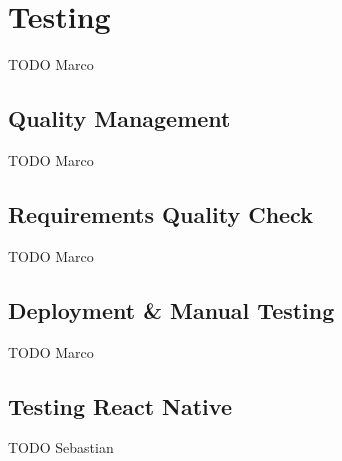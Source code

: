 \section{Testing}
\label{sec:testing}

TODO Marco

\subsection{Quality Management}
\label{ssec:quality_management}

TODO Marco

\subsection{Requirements Quality Check}
\label{ssec:requirements_quality_check}

TODO Marco

\subsection{Deployment \& Manual Testing}
\label{ssec:deployment_manual_testing}

TODO Marco

\subsection{Testing React Native}
\label{ssec:testing_react_native}

TODO Sebastian